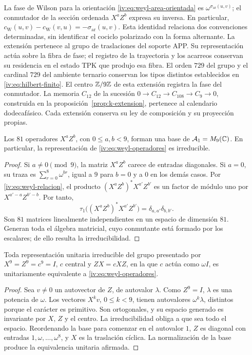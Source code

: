 La fase de Wilson para la orientación
\eqref{iv:eq:weyl-area-orientada} es
\(\omega^{\sigma_{\mathrm{ar}}(u,v)}\); el conmutador de la
sección ordenada \(X^aZ^b\) expresa su inversa. En particular,
\(c_{\mathrm W}(u,v)-c_{\mathrm W}(v,u)
=-\sigma_{\mathrm{ar}}(u,v)\).
Esta identidad relaciona dos convenciones determinadas, sin identificar
el cociclo polarizado con la forma alternante. La extensión pertenece
al grupo de traslaciones del soporte APP. Su representación actúa sobre
la fibra de fase; el registro de la trayectoria y los acarreos conservan
su residencia en el estado TPK que produjo esa fibra. El orden \(729\)
del grupo y el cardinal \(729\) del ambiente ternario conservan los
tipos distintos establecidos en \eqref{iv:eq:hilbert-finito}.
El centro \(\mathbb Z/9\mathbb Z\) de esta extensión registra la fase
del conmutador. La memoria \(C_{12}\) de la sucesión
\(0\to C_{12}\to C_{108}\to C_9\to0\), construida en la
proposición~\ref{prop:k-extension}, pertenece al calendario
dodecafásico. Cada extensión conserva su ley de composición y
su proyección propias.

\begin{proposition}
\label{iv:prop:weyl-completo}
Los \(81\) operadores \(X^aZ^b\), con \(0\leq a,b<9\), forman
una base de \(\mathcal A_1=M_9(\mathbb C)\). En particular, la
representación de \eqref{iv:eq:weyl-operadores} es irreducible.
\end{proposition}
\begin{proof}
Si \(a\neq0\pmod9\), la matriz \(X^aZ^b\) carece de entradas
diagonales. Si \(a=0\), su traza es
\(\sum_{r=0}^8\omega^{br}\), igual a \(9\) para \(b=0\) y a
\(0\) en los demás casos. Por \eqref{iv:eq:weyl-relacion}, el
producto \((X^aZ^b)^*X^{a'}Z^{b'}\) es un factor de módulo uno
por \(X^{a'-a}Z^{b'-b}\). Por tanto,
\[
 \tau_1\bigl((X^aZ^b)^*X^{a'}Z^{b'}\bigr)
 =\delta_{a,a'}\delta_{b,b'}.
\]
Son \(81\) matrices linealmente independientes en un espacio de
dimensión \(81\). Generan toda el álgebra matricial, cuyo conmutante
está formado por los escalares; de ello resulta la irreducibilidad.
\end{proof}

\begin{theorem}
\label{iv:thm:weyl-unicidad}
Toda representación unitaria irreducible del grupo presentado por
\(X^9=Z^9=c^9=I\), \(c\) central y \(ZX=cXZ\), en la que
\(c\) actúa como \(\omega I\), es unitariamente equivalente a
\eqref{iv:eq:weyl-operadores}.
\end{theorem}
\begin{proof}
Sea \(v\neq0\) un autovector de \(Z\), de autovalor \(\lambda\).
Como \(Z^9=I\), \(\lambda\) es una potencia de \(\omega\).
Los vectores \(X^kv\), \(0\leq k<9\), tienen autovalores
\(\omega^k\lambda\), distintos porque el carácter es primitivo.
Son ortogonales, y su espacio generado es invariante por \(X\),
\(Z\) y el centro. La irreducibilidad obliga a que sea todo el
espacio. Reordenando la base para comenzar en el autovalor \(1\),
\(Z\) es diagonal con entradas \(1,\omega,\ldots,\omega^8\),
y \(X\) es la traslación cíclica. La normalización de la base
produce la equivalencia unitaria afirmada.
\end{proof}

